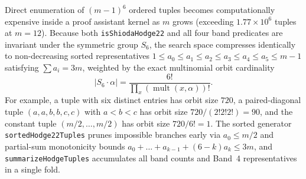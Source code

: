\documentclass[11pt,a4paper]{article}
\begin{document}
Direct enumeration of $(m-1)^6$ ordered tuples becomes computationally expensive inside a proof assistant kernel as $m$ grows (exceeding $1.77 \times 10^6$ tuples at $m = 12$). Because both \texttt{isShiodaHodge22} and all four band predicates are invariant under the symmetric group $S_6$, the search space compresses identically to non-decreasing sorted representatives $1 \le a_0 \le a_1 \le a_2 \le a_3 \le a_4 \le a_5 \le m-1$ satisfying $\sum a_i = 3m$, weighted by the exact multinomial orbit cardinality
\begin{equation}
  |S_6 \cdot \alpha| = \frac{6!}{\prod_{x} (\operatorname{mult}(x, \alpha))!}.
\end{equation}
For example, a tuple with six distinct entries has orbit size $720$, a paired-diagonal tuple $(a, a, b, b, c, c)$ with $a < b < c$ has orbit size $720 / (2!2!2!) = 90$, and the constant tuple $(m/2, \dots, m/2)$ has orbit size $720 / 6! = 1$. The sorted generator \texttt{sortedHodge22Tuples} prunes impossible branches early via $a_0 \le m/2$ and partial-sum monotonicity bounds $a_0 + \dots + a_{k-1} + (6-k)a_k \le 3m$, and \texttt{summarizeHodgeTuples} accumulates all band counts and Band~4 representatives in a single fold.
\end{document}
